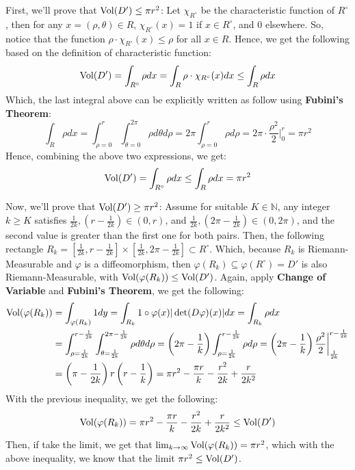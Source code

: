 \documentclass{article}
\begin{document}
First, we'll prove that $\textmd{Vol}(D')\leq \pi r^2$: Let $\chi_{R^\circ}$ be the characteristic function of $R^\circ$, then for any $x = (\rho,\theta)\in R$, $\chi_{R^\circ}(x)=1$ if $x\in R^\circ$, and $0$ elsewhere. So, notice that the function $\rho\cdot \chi_{R^\circ}(x) \leq \rho$ for all $x\in R$. Hence, we get the following based on the definition of characteristic function:
\begin{equation}
    \textmd{Vol}(D') = \int_{R^\circ}\rho dx = \int_{R}\rho\cdot \chi_{R^\circ}(x)dx \leq \int_{R}\rho dx
\end{equation}
Which, the last integral above can be explicitly written as follow using \textbf{Fubini's Theorem}:
\begin{equation}
    \int_{R}\rho dx = \int_{\rho =0}^{r}\int_{\theta=0}^{2\pi}\rho d\theta d\rho = 2\pi\int_{\rho=0}^{r}\rho d\rho = 2\pi\cdot \frac{\rho^2}{2}\bigg|_{0}^{r} = \pi r^2
\end{equation}
Hence, combining the above two expressions, we get:
\begin{equation}
    \textmd{Vol}(D') = \int_{R^\circ}\rho dx \leq \int_R\rho dx = \pi r^2
\end{equation}

Now, we'll prove that $\textmd{Vol}(D')\geq \pi r^2$: Assume for suitable $K\in\mathbb{N}$, any integer $k\geq K$ satisfies $\frac{1}{2k}, (r-\frac{1}{2k})\in (0,r)$, and $\frac{1}{2k},(2\pi -\frac{1}{2k})\in (0,2\pi)$, and the second value is greater than the first one for both pairs. Then, the following rectangle $R_k = [\frac{1}{2k},r-\frac{1}{2k}]\times [\frac{1}{2k},2\pi -\frac{1}{2k}]\subset R^\circ$. Which, because $R_k$ is Riemann-Measurable and $\varphi$ is a diffeomorphism, then $\varphi(R_k)\subseteq \varphi(R^\circ)=D'$  is also Riemann-Measurable, with $\textmd{Vol}(\varphi(R_k))\leq \textmd{Vol}(D')$. Again, apply \textbf{Change of Variable} and \textbf{Fubini's Theorem}, we get the following:
\begin{equation}
    \begin{split}
        \textmd{Vol}(\varphi(R_k)) &= \int_{\varphi(R_k)}1 dy = \int_{R_k}1\circ \varphi(x)|\det(D\varphi)(x)|dx = \int_{R_k}\rho dx\\
        &= \int_{\rho=\frac{1}{2k}}^{r-\frac{1}{2k}}\int_{\theta = \frac{1}{2k}}^{2\pi -\frac{1}{2k}}\rho d\theta d\rho = \left(2\pi-\frac{1}{k}\right)\int_{\rho=\frac{1}{2k}}^{r-\frac{1}{2k}}\rho d\rho = \left(2\pi-\frac{1}{k}\right)\frac{\rho^2}{2}\bigg|_{\frac{1}{2k}}^{r-\frac{1}{2k}}\\
        &= \left(\pi-\frac{1}{2k}\right)r\left(r-\frac{1}{k}\right) = \pi r^2 - \frac{\pi r}{k} - \frac{r^2}{2k} + \frac{r}{2k^2}
    \end{split}
\end{equation}
With the previous inequality, we get the following:
\begin{equation}
    \textmd{Vol}(\varphi(R_k)) = \pi r^2 - \frac{\pi r}{k} - \frac{r^2}{2k} + \frac{r}{2k^2}\leq \textmd{Vol}(D')
\end{equation}
Then, if take the limit, we get that $\lim_{k\rightarrow\infty}\textmd{Vol}(\varphi(R_k)) = \pi r^2$, which with the above inequality, we know that the limit $\pi r^2\leq \textmd{Vol}(D')$.
\end{document}
